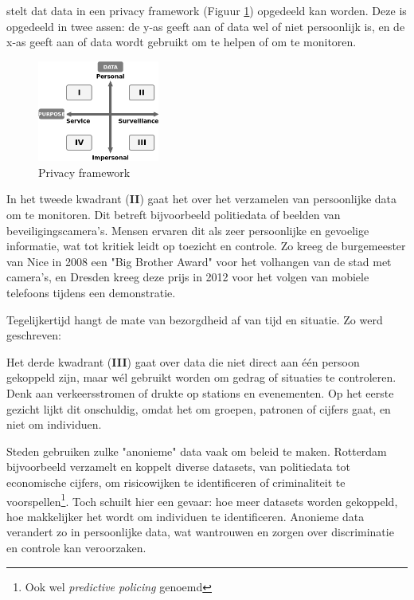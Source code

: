 \documentclass[nonacm,sigconf]{acmart}
\begin{document}
    \parencite{van2016privacy} stelt dat data in een privacy framework (Figuur \ref{fig:privacy_framework}) opgedeeld kan worden.
    Deze is opgedeeld in twee assen: de y-as geeft aan of data wel of niet persoonlijk is, en de x-as geeft aan of data wordt gebruikt om te helpen of om te monitoren.

    \begin{figure}[h]
        \centering
        \includegraphics[width=40mm]{images/SmartCityPrivacy}
        \caption{Privacy framework {\parencite[nagemaakt van][]{van2016privacy}}}
        \label{fig:privacy_framework}
    \end{figure}

    In het tweede kwadrant (\textbf{II}) gaat het over het verzamelen van persoonlijke data om te monitoren.
    Dit betreft bijvoorbeeld politiedata of beelden van beveiligingscamera's.
    Mensen ervaren dit als zeer persoonlijke en gevoelige informatie, wat tot kritiek leidt op toezicht en controle.
    Zo kreeg de burgemeester van Nice in 2008 een "Big Brother Award" voor het volhangen van de stad met camera's, en Dresden kreeg deze prijs in 2012 voor het volgen van mobiele telefoons tijdens een demonstratie.

    Tegelijkertijd hangt de mate van bezorgdheid af van tijd en situatie.
    Zo werd geschreven:

    Het derde kwadrant (\textbf{III}) gaat over data die niet direct aan één persoon gekoppeld zijn, maar wél gebruikt worden om gedrag of situaties te controleren.
    Denk aan verkeersstromen of drukte op stations en evenementen.
    Op het eerste gezicht lijkt dit onschuldig, omdat het om groepen, patronen of cijfers gaat, en niet om individuen.

    Steden gebruiken zulke "anonieme" data vaak om beleid te maken.
    Rotterdam bijvoorbeeld verzamelt en koppelt diverse datasets, van politiedata tot economische cijfers, om risicowijken te identificeren of criminaliteit te voorspellen\footnote{Ook wel \textit{predictive policing} genoemd}.
    Toch schuilt hier een gevaar: hoe meer datasets worden gekoppeld, hoe makkelijker het wordt om individuen te identificeren.
    Anonieme data verandert zo in persoonlijke data, wat wantrouwen en zorgen over discriminatie en controle kan veroorzaken.
\end{document}
